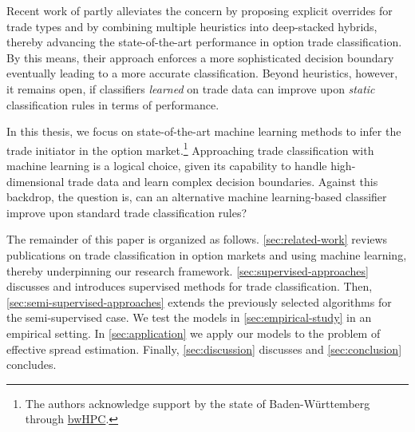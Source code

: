 
Recent work of \textcite[][13--16]{grauerOptionTradeClassification2022} partly alleviates the concern by proposing explicit overrides for trade types and by combining multiple heuristics into deep-stacked hybrids, thereby advancing the state-of-the-art performance in option trade classification. By this means, their approach enforces a more sophisticated decision boundary eventually leading to a more accurate classification. Beyond heuristics, however, it remains open, if classifiers \emph{learned} on trade data can improve upon \emph{static} classification rules in terms of performance.

In this thesis, we focus on state-of-the-art machine learning methods to infer the trade initiator in the option market.\footnote{The authors acknowledge support by the state of Baden-Württemberg through \href{https://www.bwhpc.de/}{bwHPC}.} Approaching trade classification with machine learning is a logical choice, given its capability to handle high-dimensional trade data and learn complex decision boundaries. Against this backdrop, the question is, can an alternative machine learning-based classifier improve upon standard trade classification rules?

The remainder of this paper is organized as follows. \cref{sec:related-work} reviews publications on trade classification in option markets and using machine learning, thereby underpinning our research framework. \cref{sec:supervised-approaches} discusses and introduces supervised methods for trade classification. Then, \cref{sec:semi-supervised-approaches} extends the previously selected algorithms for the semi-supervised case. We test the models in \cref{sec:empirical-study} in an empirical setting. In \cref{sec:application} we apply our models to the problem of effective spread estimation. Finally, \cref{sec:discussion} discusses and \cref{sec:conclusion} concludes.
